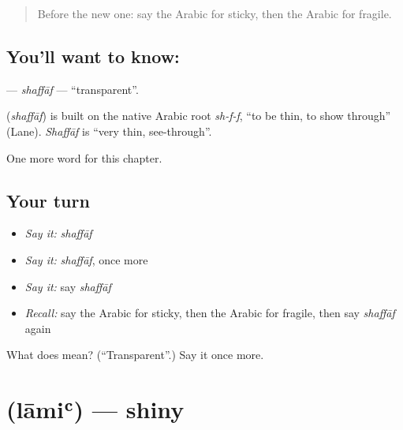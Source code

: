 \label{lesson:AR-C212-shaffaf}



\begin{quote}
Before the new one: say the Arabic for sticky, then the Arabic for fragile.
\end{quote}

\subsection*{You'll want to know: }
\textbf{} — \emph{shaffāf} — \textquotedblleft{}transparent\textquotedblright{}.

\begin{cousinweb}
\textbf{} (\emph{shaffāf}) is built on the native Arabic root \emph{sh-f-f}, \textquotedblleft{}to be thin, to show through\textquotedblright{} (Lane). \emph{Shaffāf} is \textquotedblleft{}very thin, see-through\textquotedblright{}.
\end{cousinweb}

\begin{grammarlens}[title={What you've built}]
One more word for this chapter.
\end{grammarlens}

\subsection*{Your turn}
\begin{itemize}
\raggedright
  \item \emph{Say it:} \emph{shaffāf}
  \item \emph{Say it:} \emph{shaffāf}, once more
  \item \emph{Say it:} say \emph{shaffāf}
  \item \emph{Recall:} say the Arabic for sticky, then the Arabic for fragile, then say \emph{shaffāf} again
\end{itemize}

\begin{tcolorbox}[breakable,colback=teal!4,colframe=teal!35!black,title={Before you move on}]
What does  mean? (\textquotedblleft{}Transparent\textquotedblright{}.) Say it once more.
\end{tcolorbox}
\section[\texorpdfstring{\ar{لامع} (lāmiʿ)}{لامع (lāmiʿ)}]{ (lāmiʿ) — shiny}

